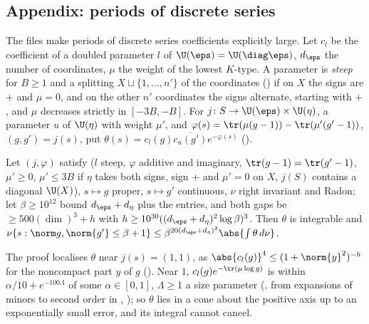 \subsection{Appendix: periods of discrete series}\label{sp-moment:ss:appendix}

The files  make periods of discrete series coefficients
explicitly large. Let $c_l$ be the coefficient of a doubled parameter $l$ of $\U(\eps)=\U(\diag\eps)$,
$d_\eps$ the number of coordinates, $\mu$ the weight of the lowest $K$-type. A parameter is
\emph{steep} for $B\ge1$ and a splitting $X\sqcup\{1,\dots,n'\}$ of the coordinates
() if on $X$ the signs are $+$ and $\mu=0$, and on the other $n'$
coordinates the signs alternate, starting with $+$, and $\mu$ decreases strictly in $[-3B,-B]$. For
$j\colon S\to\U(\eps)\times\U(\eta)$, a parameter $u$ of $\U(\eta)$ with weight $\mu'$, and
$\varphi(s)=\tr(\mu(g-1))-\tr(\mu'(g'-1))$, $(g,g')=j(s)$, put
$\theta(s)=c_l(g)\overline{c_u(g')}e^{-\varphi(s)}$ ().

\begin{theorem}
\label{sp-moment:thm:laplace}
Let $(j,\varphi)$ satisfy  ($l$ steep, $\varphi$ additive
and imaginary, $\tr(g-1)=\tr(g'-1)$, $\mu'\ge0$, $\mu'\le3B$ if $\eta$ takes both signs, sign $+$
and $\mu'=0$ on $X$, $j(S)$ contains a diagonal $\U(X)$), $s\mapsto g$ proper, $s\mapsto g'$
continuous, $\nu$ right invariant and Radon; let $\beta\ge10^{12}$ bound
$d_\eps+d_\eta$ plus the entries, and both gaps be $\ge500(\dim)^3+h$ with
$h\ge10^{30}((d_\eps+d_\eta)^2\log\beta)^3$. Then $\theta$ is integrable and
$\nu\{s:\norm g,\norm{g'}\le\beta+1\}\le\beta^{20(d_\eps+d_\eta)^2}\abs{\int\theta\,d\nu}$.
\end{theorem}

The proof localises $\theta$ near $j(s)=(1,1)$, as $\abs{c_l(g)}^4\le(1+\norm{y}^2)^{-h}$ for the
noncompact part $y$ of $g$ (). Near $1$,
$c_l(g)e^{-\tr(\mu\log g)}$ is within $\alpha/10+e^{-100\Lambda}$ of some $\alpha\in[0,1]$, $\Lambda\ge1$ a size parameter
(, from expansions of minors to
second order in ,
); so $\theta$ lies in a cone about the
positive axis up to an exponentially small error, and its integral cannot cancel.


